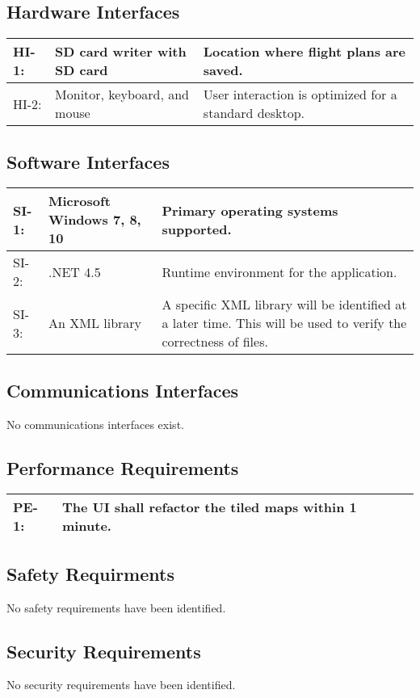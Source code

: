 \documentclass[12pt, letterpaper]{article}
\begin{document}
  \subsection{Hardware Interfaces}
    \begin{tabularx}{\textwidth}{|l|l|X|} \hline
      HI-1: & SD card writer with SD card & Location where flight plans are saved. \\ \hline
      HI-2: & Monitor, keyboard, and mouse & User interaction is optimized for a standard desktop. \\ \hline
    \end{tabularx}

  \subsection{Software Interfaces}
    \begin{tabularx}{\textwidth}{|l|l|X|} \hline
      SI-1: & Microsoft Windows 7, 8, 10 & Primary operating systems supported. \\ \hline
      SI-2: & .NET 4.5 & Runtime environment for the application. \\ \hline
      SI-3: & An XML library & A specific XML library will be identified at a later time.
        This will be used to verify the correctness of files. \\ \hline
    \end{tabularx}

  \subsection{Communications Interfaces}
  No communications interfaces exist.


  \subsection{Performance Requirements}
    \begin{tabularx}{\textwidth}{|l|X|} \hline
      PE-1: & The UI shall refactor the tiled maps within 1 minute. \\ \hline
    \end{tabularx}

  \subsection{Safety Requirments}
  No safety requirements have been identified.
  \subsection{Security Requirements}
  No security requirements have been identified.
\end{document}
